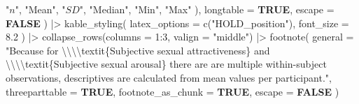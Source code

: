 \documentclass[
  bookmarksnumbered]{article}
\newenvironment{Shaded}{\begin{snugshade}}{\end{snugshade}}
\newcommand{\AttributeTok}[1]{\textcolor[rgb]{0.80,0.80,0.80}{#1}}
\newcommand{\ConstantTok}[1]{\textcolor[rgb]{0.86,0.64,0.64}{\textbf{#1}}}
\newcommand{\DecValTok}[1]{\textcolor[rgb]{0.86,0.86,0.80}{#1}}
\newcommand{\FloatTok}[1]{\textcolor[rgb]{0.75,0.75,0.82}{#1}}
\newcommand{\FunctionTok}[1]{\textcolor[rgb]{0.94,0.94,0.56}{#1}}
\newcommand{\NormalTok}[1]{\textcolor[rgb]{0.80,0.80,0.80}{#1}}
\newcommand{\SpecialCharTok}[1]{\textcolor[rgb]{0.86,0.64,0.64}{#1}}
\newcommand{\StringTok}[1]{\textcolor[rgb]{0.80,0.58,0.58}{#1}}
\begin{document}
\begin{Shaded}
\begin{Highlighting}[]
      \StringTok{"$n$"}\NormalTok{, }\StringTok{"Mean"}\NormalTok{, }\StringTok{"$SD$"}\NormalTok{, }\StringTok{"Median"}\NormalTok{, }\StringTok{"Min"}\NormalTok{, }\StringTok{"Max"}
\NormalTok{    ),}
    \AttributeTok{longtable =} \ConstantTok{TRUE}\NormalTok{,}
    \AttributeTok{escape =} \ConstantTok{FALSE}
\NormalTok{  ) }\SpecialCharTok{|\textgreater{}}
  \FunctionTok{kable\_styling}\NormalTok{(}
    \AttributeTok{latex\_options =} \FunctionTok{c}\NormalTok{(}\StringTok{"HOLD\_position"}\NormalTok{),}
    \AttributeTok{font\_size =} \FloatTok{8.2}
\NormalTok{  ) }\SpecialCharTok{|\textgreater{}}
  \FunctionTok{collapse\_rows}\NormalTok{(}\AttributeTok{columns =} \DecValTok{1}\SpecialCharTok{:}\DecValTok{3}\NormalTok{, }\AttributeTok{valign =} \StringTok{"middle"}\NormalTok{) }\SpecialCharTok{|\textgreater{}}
  \FunctionTok{footnote}\NormalTok{(}
    \AttributeTok{general =} \StringTok{"Because for }\SpecialCharTok{\textbackslash{}\textbackslash{}\textbackslash{}\textbackslash{}}\StringTok{textit\{Subjective sexual attractiveness\} and}
\StringTok{           }\SpecialCharTok{\textbackslash{}\textbackslash{}\textbackslash{}\textbackslash{}}\StringTok{textit\{Subjective sexual arousal\} there are are multiple within{-}subject}
\StringTok{           observations, descriptives are calculated from mean values per participant."}\NormalTok{,}
    \AttributeTok{threeparttable =} \ConstantTok{TRUE}\NormalTok{,}
    \AttributeTok{footnote\_as\_chunk =} \ConstantTok{TRUE}\NormalTok{,}
    \AttributeTok{escape =} \ConstantTok{FALSE}
\NormalTok{  )}
\end{Highlighting}
\end{Shaded}

\begingroup\fontsize{8.2}{10.2}\selectfont
\end{document}
